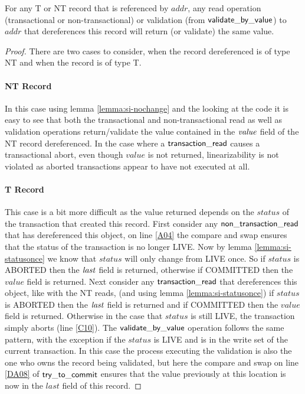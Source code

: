 \begin{lemma}
\label{lemma:si-samevalue}
For any T or NT record that is referenced by $\mathit{addr}$, any read operation (transactional or non-transactional) or validation (from $\sf{validate\_by\_value}$) to
$\mathit{addr}$ that dereferences this record will return (or validate) the same value.
\end{lemma}
\begin{proof}
There are two cases to consider, when the record dereferenced is of type NT and when the record is of type T.
\paragraph{NT Record} In this case using lemma \ref{lemma:si-nochange} and the looking at the code it is easy to see that both the transactional and non-transactional read
as well as validation operations
return/validate the value contained in the $\ms{value}$ field of the NT record dereferenced.
In the case where a $\sf{transaction\_read}$ causes a transactional abort, even though $\mathit{value}$ is not returned, linearizability is not violated
as aborted transactions appear to have not executed at all.
\paragraph{T Record} This case is a bit more difficult as the value returned depends on the $\mathit{status}$ of the transaction
that created this record.
First consider any $\sf{non\_transaction\_read}$ that has dereferenced this object, on line \ref{A04} the compare and swap ensures that the status of the transaction is
no longer LIVE.
Now by lemma \ref{lemma:si-statusonce} we know that $\mathit{status}$ will only change from LIVE once.
So if $\mathit{status}$ is ABORTED then the $\ms{last}$ field is returned, otherwise if COMMITTED then the $\mathit{value}$ field is returned.
Next consider any $\sf{transaction\_read}$ that dereferences this object, like with the NT reads,
(and using lemma \ref{lemma:si-statusonce}) if
$\mathit{status}$ is ABORTED then the $\ms{last}$ field is returned and if COMMITTED then the $\mathit{value}$ field is returned.
Otherwise in the case that $\mathit{status}$ is still LIVE, the transaction simply aborts (line \ref{C10}).
The $\sf{validate\_by\_value}$ operation follows the same pattern, with the exception if the $\mathit{status}$ is LIVE and
is in the write set of the current transaction.
In this case the process executing the validation is also the one who owns the record being validated, but here the compare
and swap on line \ref{DA08} of $\sf{try\_to\_commit}$ ensures that the value previously at this location is now in the $\mathit{last}$
field of this record.
\end{proof}




